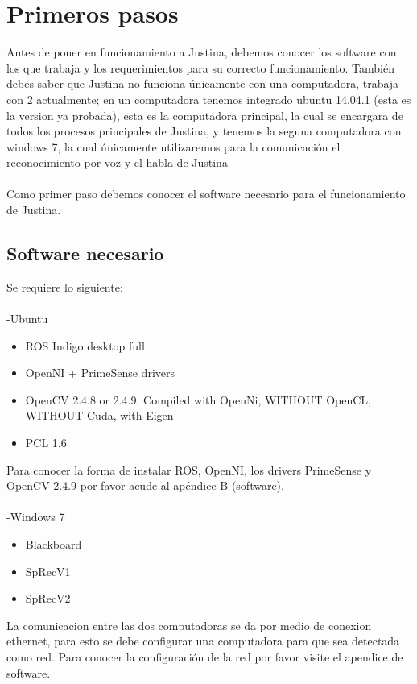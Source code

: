 \documentclass[user_manual.tex]{subfiles}
\begin{document}
 \chapter{Primeros pasos}
 Antes de poner en funcionamiento a Justina, debemos conocer los software con los que trabaja y los requerimientos para  su correcto funcionamiento. También debes saber que Justina no funciona únicamente con una computadora, trabaja con 2 actualmente; en un computadora tenemos integrado ubuntu 14.04.1 (esta es la version ya probada), esta es la computadora principal, la cual se encargara de todos los procesos principales de Justina, y tenemos la seguna computadora con windows 7, la cual únicamente utilizaremos para la comunicación el reconocimiento por voz y el habla de Justina\\
 \\
 Como primer paso debemos conocer el software necesario para el funcionamiento de Justina.
 
 \section{Software necesario}

Se requiere lo siguiente:\\
\\
-Ubuntu
\begin{itemize}
\item ROS Indigo desktop full
\item OpenNI + PrimeSense drivers
\item OpenCV 2.4.8 or 2.4.9. Compiled with OpenNi, WITHOUT OpenCL, WITHOUT Cuda, with Eigen
\item PCL 1.6
\end{itemize}

Para conocer la forma de instalar ROS, OpenNI, los drivers PrimeSense y OpenCV 2.4.9 por favor acude al apéndice B (software).\\
\\
-Windows 7
\begin{itemize}
\item Blackboard
\item SpRecV1
\item SpRecV2
\end{itemize}

La comunicacion entre las dos computadoras se da por medio de conexion ethernet, para esto se debe configurar una computadora para que sea detectada como red. Para conocer la configuración de la red por favor visite el apendice de software.
\end{document}
